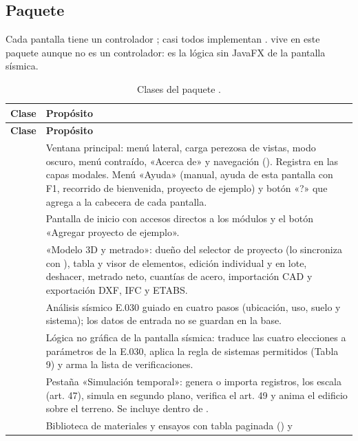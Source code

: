 \subsection{Paquete }

Cada pantalla tiene un controlador ; casi todos implementan . 
vive en este paquete aunque no es un controlador: es la lógica sin JavaFX de la pantalla sísmica.

\begin{longtable}{L{6.2cm}L{8.6cm}}
	\caption{Clases del paquete .} \label{tab:est-controller} \\
	\hline
	\textbf{Clase} & \textbf{Propósito} \\ \hline
	\endfirsthead
	\hline
	\textbf{Clase} & \textbf{Propósito} \\ \hline
	\endhead
	\hline
	\endfoot
	 & Ventana principal: menú lateral, carga perezosa de vistas, modo oscuro, menú contraído,
	«Acerca de» y navegación (). Registra en  las capas modales. Menú
	«Ayuda» (manual, ayuda de esta pantalla con F1, recorrido de bienvenida, proyecto de ejemplo) y botón «?» que
	agrega a la cabecera de cada pantalla. \\
	 & Pantalla de inicio con accesos directos a los módulos y el botón «Agregar proyecto de
	ejemplo». \\
	 & «Modelo 3D y metrado»: dueño del selector de proyecto (lo sincroniza con
	), tabla y visor de elementos, edición individual y en lote, deshacer, metrado neto,
	cuantías de acero, importación CAD y exportación DXF, IFC y ETABS. \\
	 & Análisis sísmico E.030 guiado en cuatro pasos (ubicación, uso, suelo y
	sistema); los datos de entrada no se guardan en la base. \\
	 & Lógica no gráfica de la pantalla sísmica: traduce las cuatro elecciones a parámetros de la
	E.030, aplica la regla de sistemas permitidos (Tabla 9) y arma la lista de verificaciones. \\
	 & Pestaña «Simulación temporal»: genera o importa registros, los escala (art. 47),
	simula en segundo plano, verifica el art. 49 y anima el edificio sobre el terreno. Se incluye dentro de
	. \\
	 & Biblioteca de materiales y ensayos con tabla paginada () y

\end{longtable}
